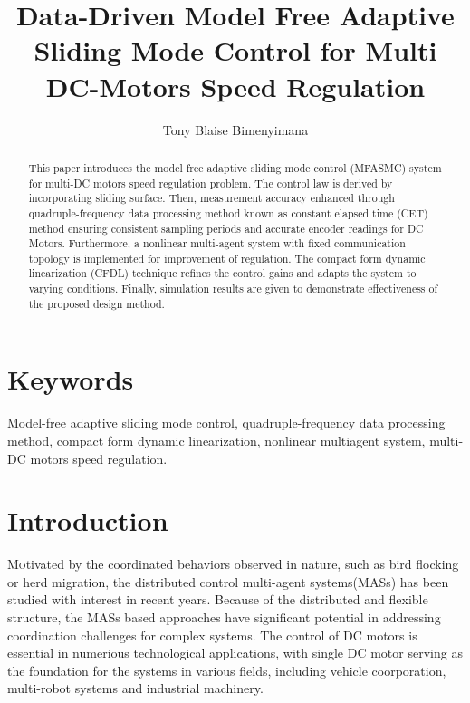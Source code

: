 \documentclass[journal,onecolumn]{IEEEtran}
\title{\LARGE Data-Driven Model Free Adaptive Sliding Mode Control for Multi DC-Motors Speed Regulation}
\author{Tony Blaise Bimenyimana}
\begin{document}
\maketitle


\begin{abstract}
    This paper introduces the model free adaptive sliding mode control (MFASMC) system for multi-DC motors speed regulation problem. The control law is derived by incorporating sliding surface. Then, measurement accuracy enhanced through quadruple-frequency data processing method known as constant elapsed time (CET) method ensuring consistent sampling periods and accurate encoder readings for DC Motors. Furthermore, a nonlinear multi-agent system with fixed communication topology is implemented for improvement of regulation. The compact form dynamic linearization (CFDL) technique refines the control gains and adapts the system to varying conditions. Finally, simulation results are given to demonstrate effectiveness of the proposed design method.
\end{abstract}

\section*{Keywords}
Model-free adaptive sliding mode control, quadruple-frequency data processing method, compact form dynamic linearization, nonlinear multiagent system, multi-DC motors speed regulation.




\section{Introduction}\label{section:1}

\lettrine{M}otivated by the coordinated behaviors observed in nature, such as bird flocking or herd migration, the distributed control multi-agent systems(MASs) has been studied with interest in recent years.\cite{1} Because of the distributed and flexible structure, the MASs based approaches have significant potential in addressing coordination challenges for complex systems\cite{2}. The control of DC motors is essential in numerious technological applications, with single DC motor serving as the foundation for the systems in various fields, including vehicle coorporation\cite{3}, multi-robot systems and industrial machinery\cite{4}. 
\end{document}

